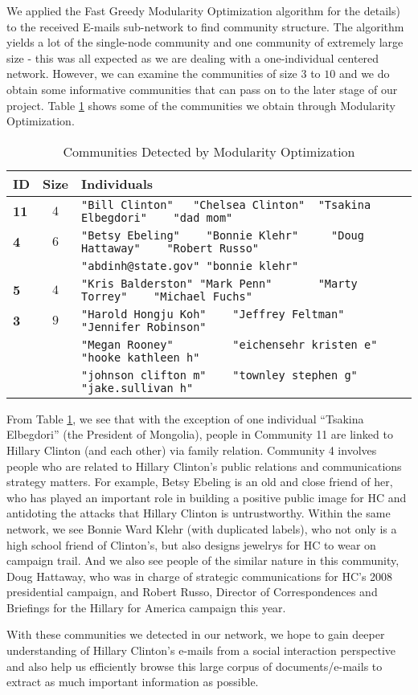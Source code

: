 We applied the Fast Greedy Modularity Optimization algorithm \cite{greedy_mod} for the details) to the received E-mails sub-network to find community structure. 
The algorithm yields a lot of the single-node community and one community of extremely large size - this was all expected as we are dealing with a one-individual centered network. 
However, we can examine the communities of size $3$ to $10$ and we do obtain some informative communities that can pass on to the later stage of our project. 
Table \ref{tab:greedy} shows some of the communities we obtain through Modularity Optimization.
\begin{table}
\centering
\begin{tabular}{|l |c| l|}\hline
{\bf ID} & \bf Size & \bf Individuals \\ \hline \hline
\bf 11 & $4$ & \verb+"Bill Clinton"   "Chelsea Clinton"  "Tsakina Elbegdori"    "dad mom"+ \\ \hline
\bf 4 & $6$ & \verb+"Betsy Ebeling"    "Bonnie Klehr"     "Doug Hattaway"    "Robert Russo"+\\
&& \verb+"abdinh@state.gov" "bonnie klehr"+\\ \hline
{\bf 5} & $4$ &\verb+"Kris Balderston" "Mark Penn"       "Marty Torrey"    "Michael Fuchs"+\\ \hline
{\bf 3} & $9$ & \verb+"Harold Hongju Koh"    "Jeffrey Feltman"      "Jennifer Robinson"+\\
&& \verb+"Megan Rooney"         "eichensehr kristen e" "hooke kathleen h"+\\
&& \verb+"johnson clifton m"    "townley stephen g"    "jake.sullivan h"+ \\
\hline 
\end{tabular}
\caption{Communities Detected by Modularity Optimization}
\label{tab:greedy}
\end{table}

From Table \ref{tab:greedy}, we see that with the exception of one individual ``Tsakina Elbegdori'' (the President of Mongolia), people in Community 11 are linked to Hillary Clinton (and each other) via family relation. 
Community 4 involves people who are related to Hillary Clinton's public relations and communications strategy matters. 
For example, Betsy Ebeling is an old and close friend of her, who has played an important role in building a positive public image for HC and antidoting the attacks that Hillary Clinton is untrustworthy. 
Within the same network, we see Bonnie Ward Klehr (with duplicated labels), who not only is a high school friend of Clinton's, but also designs jewelrys for HC to wear on campaign trail. 
And we also see people of the similar nature in this community, Doug Hattaway, who was in charge of strategic communications for HC's 2008 presidential campaign, and Robert Russo, Director of Correspondences and Briefings for the Hillary for America campaign this year. 

With these communities we detected in our network, we hope to gain deeper understanding of Hillary Clinton's e-mails from a social interaction perspective and also help us efficiently browse this large corpus of documents/e-mails to extract as much important information as possible. 